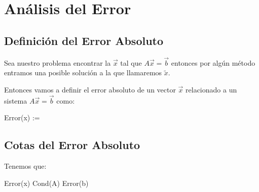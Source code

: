\documentclass[12pt, fleqn]{report}                             %
\def \Eq {equation}                                             %
\newenvironment{MultiLineEquation*}[1]                          %
        {\begin{\Eq*}\begin{alignedat}{#1}}                         %
        {\end{alignedat}\end{\Eq*}}                                 %
\newenvironment{largeEq} {\begingroup \large}{\endgroup}        %
\theoremstyle{break}                                            %
\newcommand{\Abs}[1]    {\left\lVert #1 \right\lVert}           %
\newcommand{\Color}[2]{\textcolor{#1}{#2}}                      %
\begin{document}
    \chapter{Análisis del Error}


        \clearpage
        \section{Definición del Error Absoluto}

            Sea nuestro problema encontrar la $\vec x$ tal que $A\vec x = \vec b$
            entonces por algún método entramos una posible solución a la que llamaremos
            $\tilde x$.

            Entonces vamos a definir el error absoluto de un vector $\vec x$ relacionado a un
            sistema $A \vec x = \vec b$ como:
            \begin{MultiLineEquation*}{3}
                Error(\vec x) := \dfrac{\Abs{\tilde x - \vec x}}{\vec x}
            \end{MultiLineEquation*}


        \clearpage
        \section{Cotas del Error Absoluto}

            Tenemos que:
            \begin{largeEq}
                \begin{MultiLineEquation*}{3}
                    \Color{Red700MD}{Error(\vec x)} 
                        \leq 
                    \Color{Green700MD}{Cond(A)} \; \Color{Indigo700MD}{Error(b)}
                \end{MultiLineEquation*}
            \end{largeEq}
            
\end{document}
